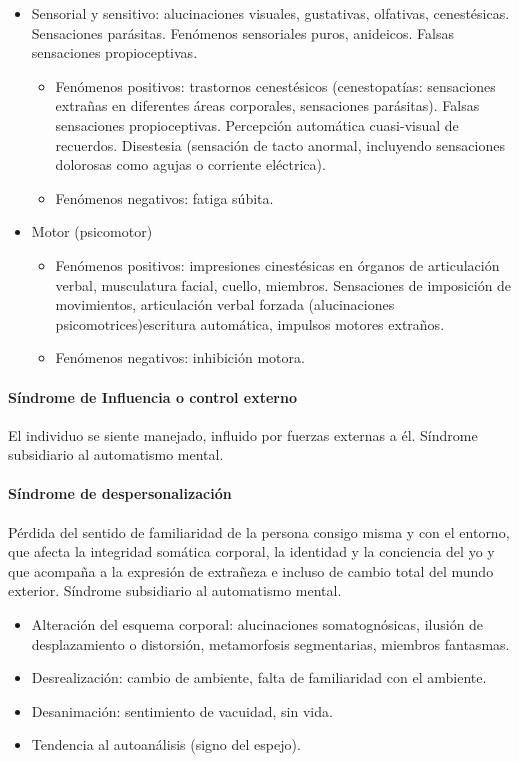 \begin{itemize}
\begin{itemize}
\begin{itemize}
        \end{itemize}
        \item Sensorial y sensitivo: alucinaciones visuales, gustativas, olfativas, cenestésicas. Sensaciones parásitas. Fenómenos sensoriales puros, anideicos. Falsas sensaciones propioceptivas.
        \begin{itemize}
            \item Fenómenos positivos: trastornos cenestésicos (cenestopatías: sensaciones extrañas en diferentes áreas corporales, sensaciones parásitas). Falsas sensaciones propioceptivas. Percepción automática cuasi-visual de recuerdos. Disestesia (sensación de tacto anormal, incluyendo sensaciones dolorosas como agujas o corriente eléctrica).
            \item Fenómenos negativos: fatiga súbita.
        \end{itemize}
        \item Motor (psicomotor)
        \begin{itemize}
            \item Fenómenos positivos: impresiones cinestésicas en órganos de articulación verbal, musculatura facial, cuello, miembros. Sensaciones de imposición de movimientos, articulación verbal forzada (alucinaciones psicomotrices)escritura automática, impulsos motores extraños.
            \item Fenómenos negativos: inhibición motora.
        \end{itemize}
    \end{itemize}
\end{itemize}
\paragraph{Síndrome de Influencia o control externo}
El individuo se siente manejado, influido por fuerzas externas a él. Síndrome subsidiario al automatismo mental.
\paragraph{Síndrome de despersonalización}
Pérdida del sentido de familiaridad de la persona consigo misma y con el entorno, que afecta la integridad somática corporal, la identidad y la conciencia del yo y que acompaña a la expresión de extrañeza e incluso de cambio total del mundo exterior. Síndrome subsidiario al automatismo mental.
\begin{itemize}
    \item Alteración del esquema corporal: alucinaciones somatognósicas, ilusión de desplazamiento o distorsión, metamorfosis segmentarias, miembros fantasmas.
    \item Desrealización: cambio de ambiente, falta de familiaridad con el ambiente.
    \item Desanimación: sentimiento de vacuidad, sin vida.
    \item Tendencia al autoanálisis (signo del espejo).
\end{itemize}
